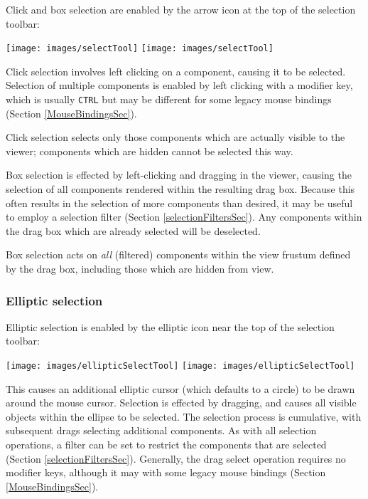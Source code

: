 \documentclass{article}
\begin{document}
Click and box selection are enabled by the arrow icon at the top of
the selection toolbar:

\vspace{\parskip}
\iflatexml
\texttt{[image: images/selectTool]}
\else
\texttt{[image: images/selectTool]}
\fi

Click selection involves left clicking on a component, causing it to
be selected. Selection of multiple components is enabled by left
clicking with a modifier key, which is usually {\tt CTRL}
but may be different for some legacy mouse bindings 
(Section \ref{MouseBindingsSec}).

\begin{sideblock}
Click selection selects only those components which are actually
visible to the viewer; components which are hidden cannot be selected
this way.
\end{sideblock}

Box selection is effected by left-clicking and dragging in the viewer,
causing the selection of all components rendered within the resulting
drag box. Because this often results in the selection of more
components than desired, it may be useful to employ a selection filter
(Section \ref{selectionFiltersSec}). Any components within the drag
box which are already selected will be deselected.

\begin{sideblock}
Box selection acts on {\it all} (filtered) components within the view
frustum defined by the drag box, including those which are hidden
from view.
\end{sideblock}

\subsubsection{Elliptic selection}

Elliptic selection is enabled by the elliptic icon near the top of
the selection toolbar:

\vspace{\parskip}
\iflatexml
\texttt{[image: images/ellipticSelectTool]}
\else
\texttt{[image: images/ellipticSelectTool]}
\fi

This causes an additional elliptic cursor (which defaults to a circle)
to be drawn around the mouse cursor. Selection is effected by
dragging, and causes all visible objects within the ellipse to be
selected. The selection process is cumulative, with subsequent drags
selecting additional components. As with all selection operations, a
filter can be set to restrict the components that are selected
(Section \ref{selectionFiltersSec}). Generally, the drag select
operation requires no modifier keys, although it may with some legacy
mouse bindings (Section \ref{MouseBindingsSec}).
\end{document}
